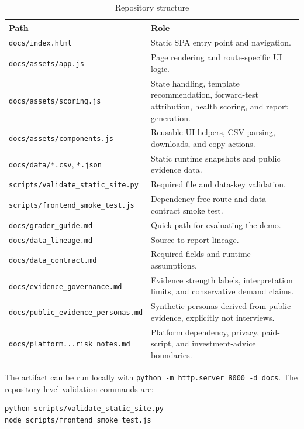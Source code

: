 \documentclass[11pt,a4paper]{article}
\begin{document}
\begin{table}[H]
\centering
\caption{Repository structure}
\scriptsize
\begin{tabularx}{\textwidth}{>{\raggedright\arraybackslash}p{4.8cm}X}
\toprule
\textbf{Path} & \textbf{Role} \\
\midrule
\texttt{docs/index.html} & Static SPA entry point and navigation. \\
\texttt{docs/assets/app.js} & Page rendering and route-specific UI logic. \\
\texttt{docs/assets/scoring.js} & State handling, template recommendation, forward-test attribution, health scoring, and report generation. \\
\texttt{docs/assets/components.js} & Reusable UI helpers, CSV parsing, downloads, and copy actions. \\
\texttt{docs/data/*.csv}, \texttt{*.json} & Static runtime snapshots and public evidence data. \\
\texttt{scripts/validate\_static\_site.py} & Required file and data-key validation. \\
\texttt{scripts/frontend\_smoke\_test.js} & Dependency-free route and data-contract smoke test. \\
\texttt{docs/grader\_guide.md} & Quick path for evaluating the demo. \\
\texttt{docs/data\_lineage.md} & Source-to-report lineage. \\
\texttt{docs/data\_contract.md} & Required fields and runtime assumptions. \\
\texttt{docs/evidence\_governance.md} & Evidence strength labels, interpretation limits, and conservative demand claims. \\
\texttt{docs/public\_evidence\_personas.md} & Synthetic personas derived from public evidence, explicitly not interviews. \\
\texttt{docs/platform...risk\_notes.md} & Platform dependency, privacy, paid-script, and investment-advice boundaries. \\
\bottomrule
\end{tabularx}
\end{table}

The artifact can be run locally with \texttt{python -m http.server 8000 -d docs}. The repository-level validation commands are:

\begin{verbatim}
python scripts/validate_static_site.py
node scripts/frontend_smoke_test.js
\end{verbatim}
\end{document}

